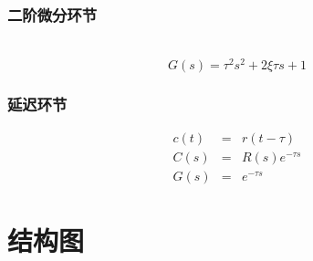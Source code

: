 \documentclass{article}
\begin{document}
\begin{frame}
\frametitle{二阶微分环节}
\label{sec-2-3-8}

　　　$$G(s)=\tau^2s^2+2\xi\tau s + 1$$
\end{frame}
\begin{frame}
\frametitle{延迟环节}
\label{sec-2-3-9}

\begin{eqnarray*}
c(t) &=& r(t-\tau) \\
C(s) &=& R(s)e^{-\tau s} \\
G(s) &=&e^{-\tau s}
\end{eqnarray*}
\end{frame}
\section{结构图}
\label{sec-3}
\end{document}
